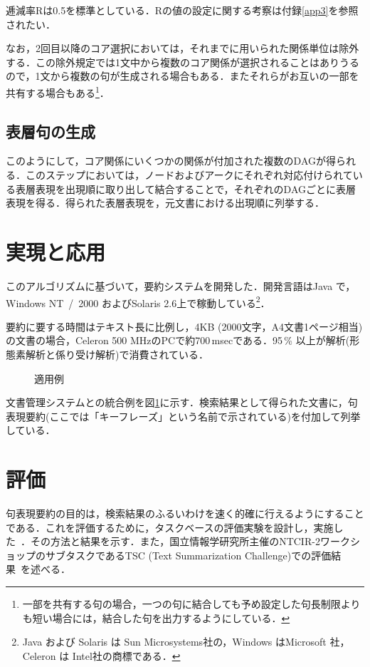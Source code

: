 逓減率Rは0.5を標準としている．Rの値の設定に関する考察は付録\ref{app3}を参照されたい．

なお，2回目以降のコア選択においては，それまでに用いられた関係単位は除外する．この除外規定では1文中から複数のコア関係が選択されることはありうるので，1文から複数の句が生成される場合もある．またそれらがお互いの一部を共有する場合もある\footnote{一部を共有する句の場合，一つの句に結合しても予め設定した句長制限よりも短い場合には，結合した句を出力するようにしている．}．

\subsection{表層句の生成}
このようにして，コア関係にいくつかの関係が付加された複数のDAGが得られる．このステップにおいては，ノードおよびアークにそれぞれ対応付けられている表層表現を出現順に取り出して結合することで，それぞれのDAGごとに表層表現を得る．得られた表層表現を，元文書における出現順に列挙する．


\section{実現と応用}
このアルゴリズムに基づいて，要約システムを開発した．開発言語はJava で，Windows NT~/~2000 およびSolaris 2.6上で稼動している\footnote{Java および Solaris は Sun Microsystems社の，Windows はMicrosoft 社，Celeron は Intel社の商標である．}．

要約に要する時間はテキスト長に比例し，4KB (2000文字，A4文書1ページ相当)の文書の場合，Celeron 500 MHzのPCで約700\,msecである．95\,\% 以上が解析(形態素解析と係り受け解析)で消費されている． 

\begin{figure}[htbp]
\vspace{-1em}
  \begin{center}
    \caption{適用例}
    \label{applyex}
  \end{center}
\end{figure}

文書管理システムとの統合例を図\ref{applyex}に示す．検索結果として得られた文書に，句表現要約(ここでは「キーフレーズ」という名前で示されている)を付加して列挙している．


\section{評価}

句表現要約の目的は，検索結果のふるいわけを速く的確に行えるようにすることである．これを評価するために，タスクベースの評価実験を設計し，実施した~\cite{oka00}．その方法と結果を示す．また，国立情報学研究所主催のNTCIR-2ワークショップのサブタスクであるTSC (Text Summarization Challenge)での評価結果~\cite{oka01}を述べる．

